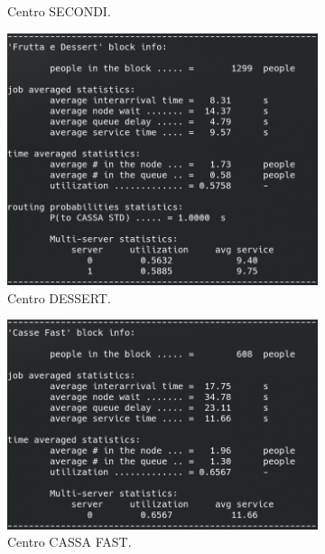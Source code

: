 \documentclass{article}
\begin{document}
\begin{figure}[H]
\begin{subfigure}{.5\textwidth}
  \caption{Centro SECONDI.}
  \label{fig:secondo_ext_1}
\end{subfigure}
\begin{subfigure}{.5\textwidth}
  \centering
  \includegraphics[width=.9\linewidth]{img/migliorativo_1/dessert_ext_1.png}
  \caption{Centro DESSERT.}
  \label{fig:dessert_ext_1}
\end{subfigure}
\begin{subfigure}{.5\textwidth}
  \centering
  \includegraphics[width=.88\linewidth]{img/migliorativo_1/fast_ext_1.png}
  \caption{Centro CASSA FAST.}
  \label{fig:cassa_fast_ext_1}
\end{subfigure}
\begin{subfigure}{.5\textwidth}
  \centering

\end{subfigure}
\end{figure}
\end{document}
